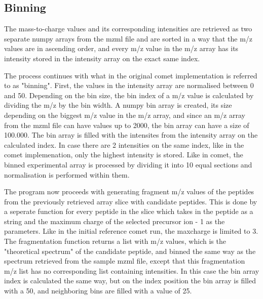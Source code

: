 \documentclass[11pt]{article}
\begin{document}
\subsection{Binning}
The mass-to-charge values and its corresponding intensities are retrieved as two separate numpy arrays from the mzml file and are sorted in a way that the m/z values are in ascending order, and every m/z value in the m/z array has its intensity stored in the intensity array on the exact same index.

The process continues with what in the original comet implementation is referred to as "binning". First, the values in the intensity array are normalised between 0 and 50. Depending on the bin size, the bin index of a m/z value is calculated by dividing the m/z by the bin width. A numpy bin array is created, its size depending on the biggest m/z value in the m/z array, and since an m/z array from the mzml file can have values up to 2000, the bin array can have a size of 100.000. The bin array is filled with the intensites from the intensity array on the calculated index. In case there are 2 intensities on the same index, like in the comet implemenation, only the highest intensity is stored. Like in comet, the binned experimental array is processed by dividing it into 10 equal sections and normalisation is performed within them.

The program now proceeds with generating fragment m/z values of the peptides from the previously retrieved array slice with candidate peptides. This is done by a seperate function for every peptide in the slice which takes in the peptide as a string and the maximum charge of the selected precursor ion - 1 as the parameters. Like in the initial reference comet run, the maxcharge is limited to 3. The fragmentation function returns a list with m/z values, which is the "theoretical spectrum" of the candidate peptide, and binned the same way as the spectrum retrieved from the sample mzml file, except that this fragmentation m/z list has no corresponding list containing intensities. In this case the bin array index is calculated the same way, but on the index position the bin array is filled with a 50, and neighboring bins are filled with a value of 25. 
\end{document}
